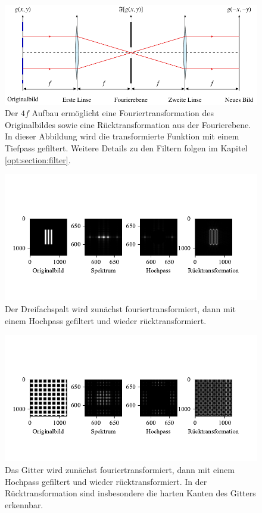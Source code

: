 \begin{figure}
    \centering
    \includegraphics[width=\textwidth]{papers/opt/images/4fAufbau.pdf}
    \caption{Der $4f$ Aufbau ermöglicht eine Fouriertransformation des Originalbildes sowie eine Rücktransformation aus der Fourierebene.
    In dieser Abbildung wird die transformierte Funktion mit einem Tiefpass gefiltert.
    Weitere Details zu den Filtern folgen im Kapitel \ref{opt:section:filter}.}
    \label{opt:fig:4fAufbau}
\end{figure}

\begin{figure}
    \centering
    \includegraphics[width=\textwidth]{papers/opt/images/dreifachspalt_hochpass.pdf}
    \caption{Der Dreifachspalt wird zunächst fouriertransformiert, dann mit einem Hochpass gefiltert und wieder rücktransformiert.}
    \label{opt:fig:three_slit_simulation}
\end{figure}

\begin{figure}
    \centering
    \includegraphics[width=\textwidth]{papers/opt/images/gitter_hochpass.pdf}
    \caption{Das Gitter wird zunächst fouriertransformiert, dann mit einem Hochpass gefiltert und wieder rücktransformiert.
    In der Rücktransformation sind insbesondere die harten Kanten des Gitters erkennbar.}
    \label{opt:fig:grid_simulation}
\end{figure}
